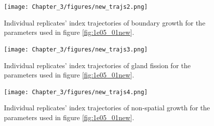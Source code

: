 \begin{figure}[h!]
    \centering
    \texttt{[image: Chapter\_3/figures/new\_trajs2.png]}
    \caption{Individual replicates' index trajectories of boundary growth for
    the parameters used in figure \ref{fig:1e05_01new}. }
    \label{fig:new_trajs2}
\end{figure}

\begin{figure}[h!]
    \centering
    \texttt{[image: Chapter\_3/figures/new\_trajs3.png]}
    \caption{Individual replicates' index trajectories of gland fission for the
    parameters used in figure \ref{fig:1e05_01new}. }
    \label{fig:new_trajs3}
\end{figure}

\begin{figure}[h!]
    \centering
    \texttt{[image: Chapter\_3/figures/new\_trajs4.png]}
    \caption{Individual replicates' index trajectories of non-spatial growth
    for the parameters used in figure \ref{fig:1e05_01new}. }
    \label{fig:new_trajs4}
\end{figure}
